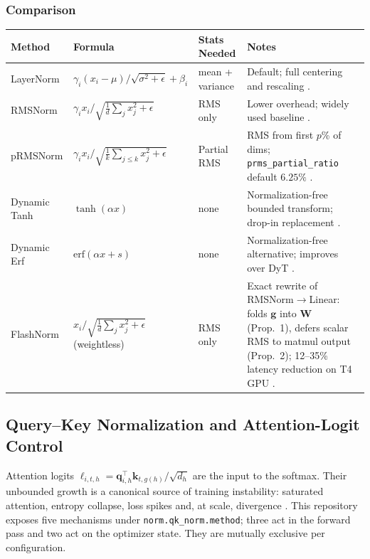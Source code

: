 \subsubsection{Comparison}
\scriptsize
\begin{longtable}{L{2.2cm}L{3.4cm}L{2.0cm}L{4.0cm}}
\toprule
\textbf{Method} & \textbf{Formula} & \textbf{Stats Needed} & \textbf{Notes} \\
\midrule
\endhead
LayerNorm & $\gamma_i (x_i - \mu)/\sqrt{\sigma^2 + \epsilon} + \beta_i$ & mean + variance & Default; full centering and rescaling \citep{ba2016layer}. \\
RMSNorm & $\gamma_i x_i/\sqrt{\frac{1}{d}\sum_j x_j^2+\epsilon}$ & RMS only & Lower overhead; widely used baseline \citep{zhang_root_2019}. \\
pRMSNorm & $\gamma_i x_i/\sqrt{\frac{1}{k}\sum_{j\le k} x_j^2+\epsilon}$ & Partial RMS & RMS from first $p$\% of dims; \texttt{prms\_partial\_ratio} default $6.25\%$ \citep{zhang_root_2019}. \\
Dynamic Tanh & $\tanh(\alpha x)$ & none & Normalization-free bounded transform; drop-in replacement \citep{zhu_transformers_2025}. \\
Dynamic Erf & $\mathrm{erf}(\alpha x+s)$ & none & Normalization-free alternative; improves over DyT \citep{chen_stronger_2025}. \\
FlashNorm & $x_i/\sqrt{\frac{1}{d}\sum_j x_j^2+\epsilon}$ (weightless) & RMS only & Exact rewrite of RMSNorm$\to$Linear: folds $\mathbf{g}$ into $\mathbf{W}$ (Prop.~1), defers scalar RMS to matmul output (Prop.~2); 12--35\% latency reduction on T4 GPU \citep{graef2026flashnorm}. \\
\bottomrule
\end{longtable}
\normalsize

\subsection{Query--Key Normalization and Attention-Logit Control}
\label{sec:annex-qk-norm}

Attention logits $\ell_{i,t,h} = \mathbf{q}_{i,h}^\top \mathbf{k}_{t,g(h)} / \sqrt{d_h}$ are the input to the softmax. Their unbounded growth is a canonical source of training instability: saturated attention, entropy collapse, loss spikes and, at scale, divergence \citep{henry2020querykey,kimi2025k2}. This repository exposes five mechanisms under \texttt{norm.qk\_norm.method}; three act in the forward pass and two act on the optimizer state. They are mutually exclusive per configuration.


